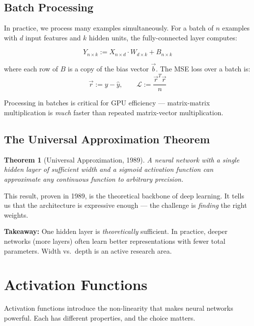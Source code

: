 \documentclass[12pt]{article}
\newtheorem{theorem}{Theorem}
\begin{document}
\subsection{Batch Processing}

In practice, we process many examples simultaneously. For a batch of $n$ examples with $d$ input features and $k$ hidden units, the fully-connected layer computes:

\[
Y_{n \times k} := X_{n \times d} \cdot W_{d \times k} + B_{n \times k}
\]

where each row of $B$ is a copy of the bias vector $\vec{b}$. The MSE loss over a batch is:
\[
\vec{r} := y - \hat{y}, \qquad \mathcal{L} := \frac{\vec{r}^T\vec{r}}{n}
\]

Processing in batches is critical for GPU efficiency --- matrix-matrix multiplication is \emph{much} faster than repeated matrix-vector multiplication.

\subsection{The Universal Approximation Theorem}

\begin{theorem}[Universal Approximation, 1989]
A neural network with a single hidden layer of sufficient width and a sigmoid activation function can approximate any continuous function to arbitrary precision.
\end{theorem}

This result, proven in 1989, is the theoretical backbone of deep learning. It tells us that the architecture is expressive enough --- the challenge is \emph{finding} the right weights.

\begin{takeawaybox}
\textbf{Takeaway:} One hidden layer is \emph{theoretically} sufficient. In practice,
deeper networks (more layers) often learn better representations with fewer total
parameters. Width vs.\ depth is an active research area.
\end{takeawaybox}

\section{Activation Functions}

Activation functions introduce the non-linearity that makes neural networks powerful.
Each has different properties, and the choice matters.
\end{document}
